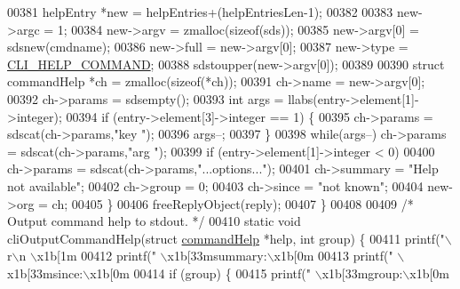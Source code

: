 \begin{DoxyCode}
{{{{{{{00381         helpEntry *\textcolor{keyword}{new} = helpEntries+(helpEntriesLen-1);
00382 
00383         \textcolor{keyword}{new}->argc = 1;
00384         \textcolor{keyword}{new}->argv = zmalloc(\textcolor{keyword}{sizeof}(sds));
00385         \textcolor{keyword}{new}->argv[0] = sdsnew(cmdname);
00386         \textcolor{keyword}{new}->full = \textcolor{keyword}{new}->argv[0];
00387         \textcolor{keyword}{new}->type = \hyperlink{redis-cli_8c_ad5a18b7d635c6438f512f3c5d7f9f546}{CLI\_HELP\_COMMAND};
00388         sdstoupper(\textcolor{keyword}{new}->argv[0]);
00389 
00390         \textcolor{keyword}{struct} commandHelp *ch = zmalloc(\textcolor{keyword}{sizeof}(*ch));
00391         ch->name = \textcolor{keyword}{new}->argv[0];
00392         ch->params = sdsempty();
00393         \textcolor{keywordtype}{int} args = llabs(entry->element[1]->integer);
00394         \textcolor{keywordflow}{if} (entry->element[3]->integer == 1) \{
00395             ch->params = sdscat(ch->params,\textcolor{stringliteral}{"key "});
00396             args--;
00397         \}
00398         \textcolor{keywordflow}{while}(args--) ch->params = sdscat(ch->params,\textcolor{stringliteral}{"arg "});
00399         \textcolor{keywordflow}{if} (entry->element[1]->integer < 0)
00400             ch->params = sdscat(ch->params,\textcolor{stringliteral}{"...options..."});
00401         ch->summary = \textcolor{stringliteral}{"Help not available"};
00402         ch->group = 0;
00403         ch->since = \textcolor{stringliteral}{"not known"};
00404         \textcolor{keyword}{new}->org = ch;
00405     \}
00406     freeReplyObject(reply);
00407 \}
00408 
00409 \textcolor{comment}{/* Output command help to stdout. */}
00410 \textcolor{keyword}{static} \textcolor{keywordtype}{void} cliOutputCommandHelp(\textcolor{keyword}{struct} \hyperlink{structcommandHelp}{commandHelp} *help, \textcolor{keywordtype}{int} group) \{
00411     printf(\textcolor{stringliteral}{"\(\backslash\)r\(\backslash\)n  \(\backslash\)x1b[1m%
00412     printf(\textcolor{stringliteral}{"  \(\backslash\)x1b[33msummary:\(\backslash\)x1b[0m %
00413     printf(\textcolor{stringliteral}{"  \(\backslash\)x1b[33msince:\(\backslash\)x1b[0m %
00414     \textcolor{keywordflow}{if} (group) \{
00415         printf(\textcolor{stringliteral}{"  \(\backslash\)x1b[33mgroup:\(\backslash\)x1b[0m %
}}}}}}}}}}}
\end{DoxyCode}
